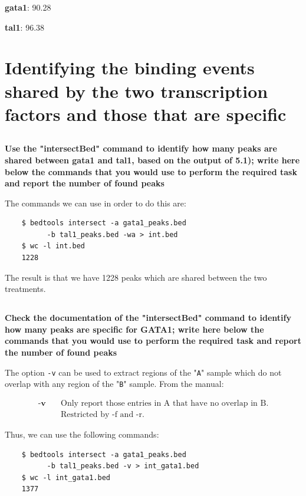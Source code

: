 \documentclass[12pt, a4paper]{article}
\begin{document}
	\textbf{gata1}: 90.28
	
	\textbf{tal1}: 96.38
	
	
	\section{Identifying the binding events shared by the two transcription factors and those that are specific}
	
	\subsection{}
	\textbf{Use the "intersectBed" command to identify how many peaks are shared between gata1 and tal1, based on the output of 5.1); write here below the commands that you would use to perform the required task and report the number of found peaks}
	
	The commands we can use in order to do this are:
	
	\begin{verbatim}
	$ bedtools intersect -a gata1_peaks.bed 
	      -b tal1_peaks.bed -wa > int.bed
	$ wc -l int.bed
	1228
	\end{verbatim}
	
	The result is that we have 1228 peaks which are shared between the two treatments.
	
	\subsection{}
	\textbf{Check the documentation of the "intersectBed" command to identify how many peaks are specific for GATA1; write here below the commands that you would use to perform the required task and report the number of found peaks}
	
	The option \verb|-v| can be used to extract regions of the "\verb|A|" sample which do not overlap with any region of the "\verb|B|" sample. From the manual:
	\begin{displayquote}
		\begin{align*}
			\textbf{-v} \quad & \text{Only report those entries in A that have no overlap in B.}\\
			& \text{Restricted by -f and -r.}
		\end{align*}
	\end{displayquote}
	
	Thus, we can use the following commands:
	
	\begin{verbatim}
	$ bedtools intersect -a gata1_peaks.bed
	      -b tal1_peaks.bed -v > int_gata1.bed
	$ wc -l int_gata1.bed
	1377
	\end{verbatim}
	
\end{document}
